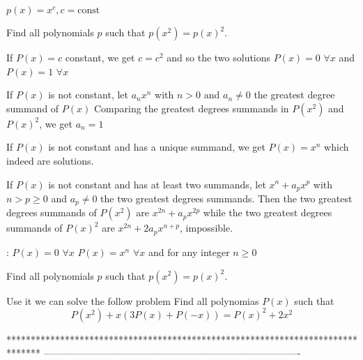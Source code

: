 \begin{solution}
	$p(x)=x^c,c={\text{const}}$
\end{solution}



\begin{solution}
	\begin{tcolorbox}Find all polynomials $p$ such that $p(x^{2})= p(x)^{2}$.\end{tcolorbox}
If $P(x)=c$ constant, we get $c=c^2$ and so the two solutions $P(x)=0$ $\forall x$ and $P(x)=1$ $\forall x$

If $P(x)$ is not constant, let $a_nx^n$ with $n>0$ and $a_n\ne 0$ the greatest degree summand of $P(x)$
Comparing the greatest degrees summands in $P(x^2)$ and $P(x)^2$, we get $a_n=1$

If $P(x)$ is not constant and has a unique summand, we get  $P(x)=x^n$ which indeed are solutions.

If $P(x)$ is not constant and has at least two summands, let $x^n+a_px^p$ with $n>p\ge 0$ and $a_p\ne 0$ the two greatest degrees summands.
Then the two greatest degrees summands of $P(x^2)$ are $x^{2n}+a_px^{2p}$ while the two greatest degrees summands of $P(x)^2$ are $x^{2n}+2a_px^{n+p}$, impossible.

 :
$P(x)=0$ $\forall x$
$P(x)=x^n$ $\forall x$ and for any integer $n\ge 0$
\end{solution}



\begin{solution}
	\begin{tcolorbox}Find all polynomials $p$ such that $p(x^{2})= p(x)^{2}$.\end{tcolorbox}
Use it we can solve the follow problem
Find all polynomias $P(x)$ such that
\[P(x^2)+x(3P(x)+P(-x))=P(x)^2+2x^2\]
\end{solution}



*******************************************************************************
-------------------------------------------------------------------------------

